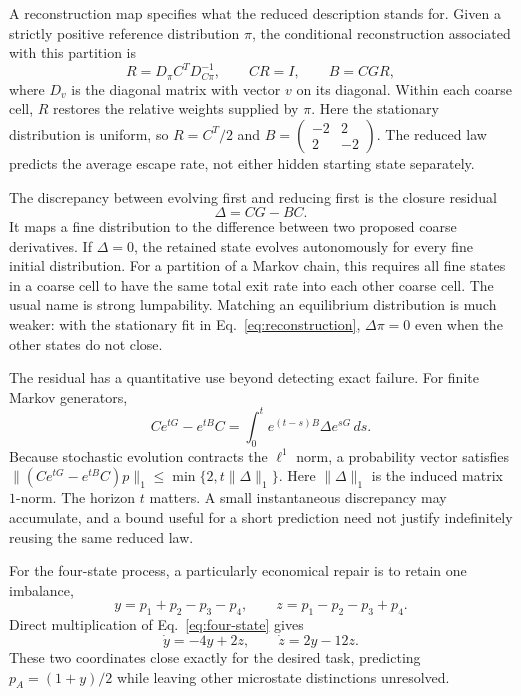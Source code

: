 A reconstruction map specifies what the reduced description stands for. Given a strictly positive reference distribution $\pi$, the conditional reconstruction associated with this partition is
\begin{equation}
 R=D_\pi C^T D_{C\pi}^{-1},\qquad CR=I,\qquad B=CGR,
 \label{eq:reconstruction}
\end{equation}
where $D_v$ is the diagonal matrix with vector $v$ on its diagonal. Within each coarse cell, $R$ restores the relative weights supplied by $\pi$. Here the stationary distribution is uniform, so $R=C^T/2$ and
$B=\left(\begin{smallmatrix}-2&2\\2&-2\end{smallmatrix}\right)$.
The reduced law predicts the average escape rate, not either hidden starting state separately.

The discrepancy between evolving first and reducing first is the closure residual
\begin{equation}
 \Delta=CG-BC.
 \label{eq:closure-residual}
\end{equation}
It maps a fine distribution to the difference between two proposed coarse derivatives. If $\Delta=0$, the retained state evolves autonomously for every fine initial distribution. For a partition of a Markov chain, this requires all fine states in a coarse cell to have the same total exit rate into each other coarse cell. The usual name is strong lumpability. Matching an equilibrium distribution is much weaker: with the stationary fit in Eq.~\eqref{eq:reconstruction}, $\Delta\pi=0$ even when the other states do not close.

The residual has a quantitative use beyond detecting exact failure. For finite Markov generators,
\begin{equation}
 C e^{tG}-e^{tB}C
 =\int_0^t e^{(t-s)B}\Delta e^{sG}\,ds.
 \label{eq:duhamel}
\end{equation}
Because stochastic evolution contracts the $\ell^1$ norm, a probability vector satisfies
$\|(C e^{tG}-e^{tB}C)p\|_1\leq\min\{2,t\|\Delta\|_1\}$.
Here $\|\Delta\|_1$ is the induced matrix $1$-norm. The horizon $t$ matters. A small instantaneous discrepancy may accumulate, and a bound useful for a short prediction need not justify indefinitely reusing the same reduced law.

For the four-state process, a particularly economical repair is to retain one imbalance,
\[
 y=p_1+p_2-p_3-p_4,\qquad
 z=p_1-p_2-p_3+p_4.
\]
Direct multiplication of Eq.~\eqref{eq:four-state} gives
\begin{equation}
 \dot y=-4y+2z,\qquad \dot z=2y-12z.
 \label{eq:two-coordinate}
\end{equation}
These two coordinates close exactly for the desired task, predicting $p_A=(1+y)/2$ while leaving other microstate distinctions unresolved.

